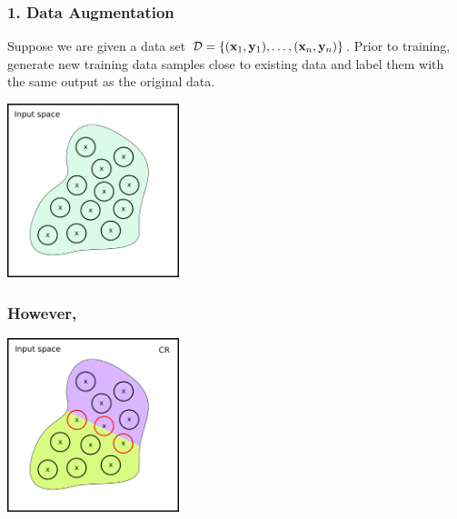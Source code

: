 \documentclass[aspectratio=169]{beamer}
\begin{document}
\begin{frame}[fragile]
  \frametitle{1. Data Augmentation}
  Suppose we are given a data set $\mathcal{D} =  \{(\mathbf{x}_1, \mathbf{y}_1), \ldots , (\mathbf{x}_n, \mathbf{y}_n)\}$.
  Prior to training, generate new training data samples close to existing data and label them with the same output as the original data.
      {\scriptsize
 \begin{thebibliography}{99}
   \beamertemplatearticlebibitems
\end{thebibliography}}


\begin{center}

  \includegraphics[width=5cm]{Images/SR-vs-CR-2.png}

  \end{center}
  
\end{frame}




\begin{frame}[fragile]
  \frametitle{However,}


\begin{center}

  \includegraphics[width=5cm]{Images/SR-vs-CR-4.png}

  \end{center}
  
\end{frame}
\end{document}
